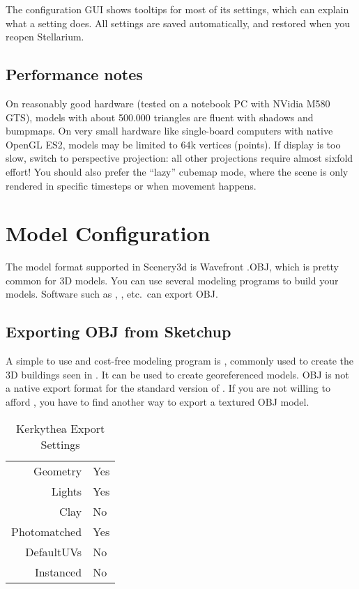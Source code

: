 The configuration GUI shows tooltips for most of its settings, which can explain
what a setting does. All settings are saved automatically, and restored when you
reopen Stellarium.


\subsection{Performance notes}
\label{sec:scenery3d:Performance}

On reasonably good hardware 
(tested on a notebook PC with NVidia M580 GTS), models with about
500.000 triangles are fluent with shadows and bumpmaps.  On very small
hardware like single-board computers with native OpenGL ES2, models
may be limited to 64k vertices (points).  If display is too slow,
switch to perspective projection: all other projections require almost
sixfold effort!  You should also prefer the ``lazy'' cubemap mode, 
where the scene is only rendered in specific timesteps or
when movement happens.  


\section{Model Configuration}
\label{sec:scenery3d:ModelConfiguration}

The model format supported in Scenery3d is Wavefront .OBJ, which is
pretty common for 3D models.  You can use several modeling programs to
build your models. Software such as , ,  etc.\ can export OBJ. 

\subsection{Exporting OBJ from Sketchup}
\label{sec:scenery3d:sketchup}

A simple to use and cost-free modeling program is , commonly
used to create the 3D buildings seen in . It can be used
to create georeferenced models.  OBJ is not a native export format for
the standard version of . If you are not willing to
afford , you have to find another way to export a textured
OBJ model.


\begin{table}[t]
  \centering
\begin{tabular}{rl}\toprule
Geometry&Yes\\Lights&Yes\\Clay&No\\Photomatched&Yes\\DefaultUVs&No\\Instanced&No\\\bottomrule
\end{tabular}
\caption{Kerkythea Export Settings}
  \label{fig:scenery3d:KerkytheaExportSettings}
\end{table}

